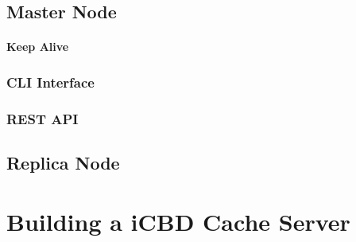 \subsection{Master Node}
\label{sub:rep_master_node}

\paragraph{Keep Alive}
\label{par:rep_keep_alive}

\subsubsection{CLI Interface}
\label{subsub:rep_cli_interface}

\subsubsection{REST API}
\label{subsub:rep_restapi}

\subsection{Replica Node}
\label{sub:rep_replica_node}






\section{Building a iCBD Cache Server}
\label{sec:impl_cache_server}


